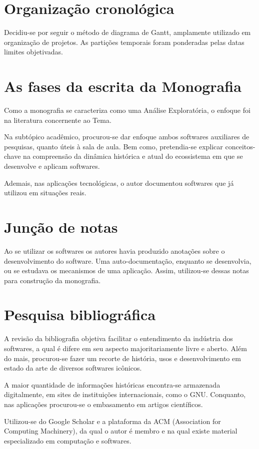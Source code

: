 \documentclass[
12pt,				%
openright,			%
oneside,			%
a4paper,			%
english,			%
french,				%
spanish,			%
brazil,				%
]{abntex2}
\begin{document}
\section{Organização cronológica}
Decidiu-se por seguir o método de diagrama de Gantt, amplamente
utilizado em organização de projetos. As partições temporais foram
ponderadas pelas datas limites objetivadas.

\section{As fases da escrita da Monografia}
Como a monografia se caracteriza como uma Análise Exploratória, o
enfoque foi na literatura concernente ao Tema.

Na subtópico acadêmico, procurou-se dar enfoque ambos softwares auxiliares
de pesquisas, quanto úteis à sala de aula. Bem como, pretendia-se
explicar conceitos-chave na compreensão da dinâmica histórica e atual
do ecossistema em que se desenvolve e aplicam softwares.

Ademais, nas aplicações tecnológicas, o autor documentou softwares que
já utilizou em situações reais.

\section{Junção de notas}
Ao se utilizar os softwares os autores havia produzido anotações sobre
o desenvolvimento do software. Uma auto-documentação, enquanto se
desenvolvia, ou se estudava os mecanismos de uma aplicação. Assim,
utilizou-se dessas notas para construção da monografia.

\section{Pesquisa bibliográfica}
A revisão da bibliografia objetiva facilitar o entendimento da
indústria dos softwares, a qual é difere em seu aspecto
majoritariamente livre e aberto. Além do mais, procurou-se fazer um
recorte de história, usos e desenvolvimento em estado da arte de
diversos softwares icônicos.

A maior quantidade de informações históricas encontra-se armazenada
digitalmente, em sites de instituições internacionais, como o
GNU. Conquanto, nas aplicações procurou-se o embasamento em artigos
científicos.

Utilizou-se do Google Scholar e a plataforma da ACM (Association for
Computing Machinery), da qual o autor é
membro e na qual existe material especializado em computação e softwares.
\end{document}
